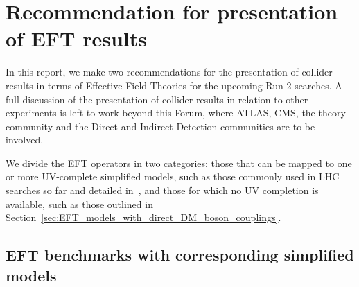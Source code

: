 \section{Recommendation for presentation of EFT results} %
\label{sec:RecommendationEFTResults}

In this report,
we make two recommendations for the presentation of collider results
in terms of Effective Field Theories for the upcoming Run-2 searches. 
A full discussion of the presentation of
collider results in relation to other experiments
is left to work beyond this Forum, where ATLAS, CMS, the theory community
and the Direct and Indirect Detection communities are to be involved. 

We divide the EFT operators in two categories: 
those that can be mapped to one or more UV-complete simplified models, such as those
commonly used in LHC searches so far and detailed in~\cite{Goodman:2010ku}, and those
for which no UV completion is available, such as those outlined in Section~\ref{sec:EFT_models_with_direct_DM_boson_couplings}.

\subsection{EFT benchmarks with corresponding simplified models}
\label{sub:EFT_withSimp}

